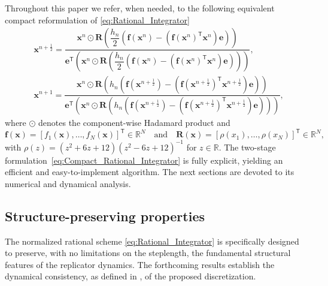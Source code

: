 \documentclass[11pt,letterpaper]{article}
\theoremstyle{remark}
\begin{document}
Throughout this paper we refer, when needed, to the following equivalent compact reformulation of \eqref{eq:Rational_Integrator}
\begin{equation}\label{eq:Compact_Rational_Integrator}
    \begin{split}
        &\bm{x}^{n+\frac{1}{2}} = \dfrac{ \bm{x}^n \odot \bm{R}\left(\dfrac{h_n}{2} \left( \bm{f}(\bm{x}^n) - \left(\bm{f}(\bm{x}^n)^\mathsf{T}\bm{x}^n \right) \bm{e} \right)\right) }{ \bm{e}^{\mathsf{T}} \left( \bm{x}^n \odot \bm{R}\left(\dfrac{h_n}{2} \left( \bm{f}(\bm{x}^n) - \left(\bm{f}(\bm{x}^n)^\mathsf{T}\bm{x}^n \right) \bm{e} \right)\right) \right) }, \\[1.2ex]
        &\bm{x}^{n+1} = \dfrac{ \bm{x}^{n} \odot \bm{R} \left( h_n \left( \bm{f}(\bm{x}^{n+\frac{1}{2}}) - \left( \bm{f}(\bm{x}^{n+\frac{1}{2}})^{\mathsf{T}} \bm{x}^{n+\frac{1}{2}} \right) \bm{e} \right) \right) }{ \bm{e}^{\mathsf{T}}  \left( \bm{x}^{n} \odot \bm{R} \left( h_n \left( \bm{f}(\bm{x}^{n+\frac{1}{2}}) - \left( \bm{f}(\bm{x}^{n+\frac{1}{2}})^{\mathsf{T}} \bm{x}^{n+\frac{1}{2}} \right) \bm{e} \right) \right) \right) },
    \end{split}
\end{equation}
where $\odot$ denotes the component-wise Hadamard product and
\begin{equation*}
    \bm{f}(\bm{x})=[f_1(\bm{x}),\dots,f_N(\bm{x})]^\mathsf{T}\in \mathbb{R}^N \quad \text{and} \quad \bm{R}(\bm{x})=[\rho(x_1),\dots,\rho(x_N)]^\mathsf{T}\in \mathbb{R}^N,
\end{equation*}
with $\rho(z)=(z^2+6z+12)(z^2-6z+12)^{-1}$ for $z\in \mathbb{R}.$ The two-stage formulation~\eqref{eq:Compact_Rational_Integrator} is fully explicit, yielding an efficient and easy-to-implement algorithm. The next sections are devoted to its numerical and dynamical analysis.

\subsection{Structure-preserving properties}\label{subsec:Structural_Preserviation}
The normalized rational scheme \eqref{eq:Rational_Integrator} is specifically designed to preserve, with no limitations on the steplength, the fundamental structural features of the replicator dynamics. The forthcoming results establish the dynamical consistency, as defined in \cite{Dynamic,Dang}, of the proposed discretization. 
\end{document}
